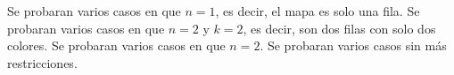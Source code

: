 \documentclass{oci}
\begin{document}
\begin{scoreDescription}
  Se probaran varios casos en que $n = 1$, es decir, el mapa es solo una fila.
  Se probaran varios casos en que $n = 2$ y $k = 2$, es decir, son dos filas con solo dos colores.
  Se probaran varios casos en que $n = 2$.
  Se probaran varios casos sin más restricciones.
\end{scoreDescription}

\begin{sampleDescription}
\end{sampleDescription}
\end{document}
